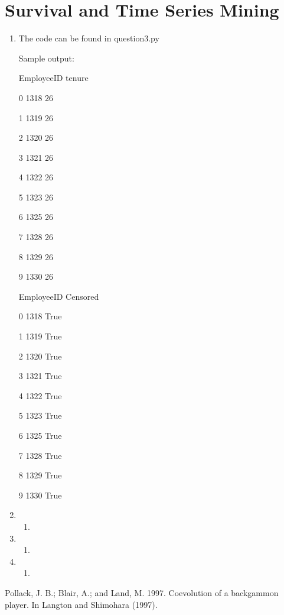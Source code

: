 \documentclass[12pt,a4paper]{article}
\begin{document}
\section{Survival and Time Series Mining}
	\begin{enumerate}[label=(\alph*)]
		\item 
		The code can be found in question3.py		
		
		Sample output:
		
		   EmployeeID  tenure
		   
0        1318      26

1        1319      26

2        1320      26

3        1321      26

4        1322      26

5        1323      26

6        1325      26

7        1328      26

8        1329      26

9        1330      26

   EmployeeID Censored

0        1318     True

1        1319     True

2        1320     True

3        1321     True

4        1322     True

5        1323     True

6        1325     True

7        1328     True

8        1329     True

9        1330     True

		\item 
			\begin{enumerate}[label=\roman*.]
				\item 	
			\end{enumerate}
		\item 
			\begin{enumerate}[label=\roman*.]
				\item 		
			\end{enumerate}
		\item 
			\begin{enumerate}[label=\roman*.]
				\item 		
			\end{enumerate}
	\end{enumerate}


\begin{thebibliography}{9}
Pollack, J. B.; Blair, A.; and Land, M. 1997. Coevolution of a backgammon player. In Langton and Shimohara (1997).
\end{thebibliography}
\end{document}
